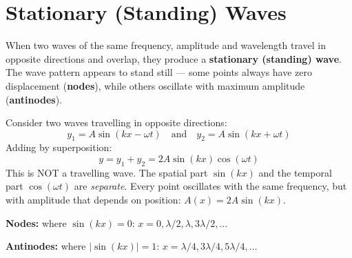 \section{Stationary (Standing) Waves}

When two waves of the same frequency, amplitude and
wavelength travel in opposite directions and overlap,
they produce a \textbf{stationary (standing) wave}.
The wave pattern appears to stand still --- some
points always have zero displacement
(\textbf{nodes}), while others oscillate with
maximum amplitude (\textbf{antinodes}).

\begin{processbox}
Consider two waves travelling in opposite directions:
\[
  y_1 = A\sin(kx - \omega t)
  \quad \text{and} \quad
  y_2 = A\sin(kx + \omega t)
\]
Adding by superposition:
\[
  y = y_1 + y_2 = 2A\sin(kx)\cos(\omega t)
\]
This is NOT a travelling wave. The spatial part
$\sin(kx)$ and the temporal part $\cos(\omega t)$
are \textit{separate}. Every point oscillates with
the same frequency, but with amplitude that depends
on position: $A(x) = 2A\sin(kx)$.

\textbf{Nodes:} where $\sin(kx) = 0$:
$x = 0, \lambda/2, \lambda, 3\lambda/2, \ldots$

\textbf{Antinodes:} where $|\sin(kx)| = 1$:
$x = \lambda/4, 3\lambda/4, 5\lambda/4, \ldots$
\end{processbox}

